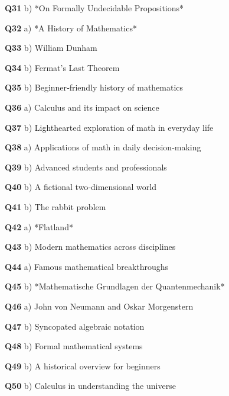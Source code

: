\textbf{Q31} b) *On Formally Undecidable Propositions*\par
\textbf{Q32} a) *A History of Mathematics*\par
\textbf{Q33} b) William Dunham\par
\textbf{Q34} b) Fermat's Last Theorem\par
\textbf{Q35} b) Beginner‑friendly history of mathematics\par
\textbf{Q36} a) Calculus and its impact on science\par
\textbf{Q37} b) Lighthearted exploration of math in everyday life\par
\textbf{Q38} a) Applications of math in daily decision‑making\par
\textbf{Q39} b) Advanced students and professionals\par
\textbf{Q40} b) A fictional two‑dimensional world\par
\textbf{Q41} b) The rabbit problem\par
\textbf{Q42} a) *Flatland*\par
\textbf{Q43} b) Modern mathematics across disciplines\par
\textbf{Q44} a) Famous mathematical breakthroughs\par
\textbf{Q45} b) *Mathematische Grundlagen der Quantenmechanik*\par
\textbf{Q46} a) John von Neumann and Oskar Morgenstern\par
\textbf{Q47} b) Syncopated algebraic notation\par
\textbf{Q48} b) Formal mathematical systems\par
\textbf{Q49} b) A historical overview for beginners\par
\textbf{Q50} b) Calculus in understanding the universe\par